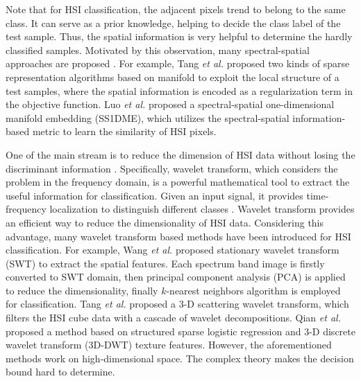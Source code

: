 \documentclass{ws-ijwmip}
\begin{document}
Note that for HSI classification, the adjacent pixels trend to belong to the same class.
It can serve as a prior knowledge, helping to decide the class label of the test sample.
Thus, the spatial information is very helpful to determine the hardly classified samples.
Motivated by this observation, 
many spectral-spatial approaches are proposed \cite{19}.
For example, 
Tang {\it et al.} \cite{20} proposed two kinds of sparse representation algorithms based on manifold to exploit the local structure of a test samples, where the spatial information is encoded as a regularization term in the objective function.
Luo {\it et al.} \cite{21} proposed a spectral-spatial one-dimensional manifold embedding (SS1DME), which utilizes the spectral-spatial information-based metric to learn the similarity of HSI pixels.

One of the main stream is to reduce the dimension of HSI data without losing the discriminant information \cite{10,11,12}.
Specifically, wavelet transform, which considers the problem in the frequency domain, is a powerful mathematical tool to extract the useful information for classification. 
Given an input signal, it provides time-frequency localization to distinguish different classes \cite{nayak2016brain}.
Wavelet transform provides an efficient way to reduce the dimensionality of HSI data.
Considering this advantage, 
many wavelet transform based methods have been introduced for HSI classification. For example, Wang {\it et al.} \cite{22} proposed stationary wavelet transform (SWT) to extract the spatial features. 
Each spectrum band image is firstly converted to SWT domain, then principal component analysis (PCA) is applied to reduce the dimensionality, finally $k$-nearest neighbors algorithm is employed for classification. 
Tang {\it et al.} \cite{24} proposed a 3-D scattering wavelet transform, which filters the HSI cube data with a cascade of wavelet decompositions\cite{25}.
Qian {\it et al.} \cite{29} proposed a method based on structured sparse logistic regression and 3-D discrete wavelet transform (3D-DWT) texture features.
However, the aforementioned methods work on high-dimensional space.
The complex theory makes the decision bound hard to determine.
\end{document}
